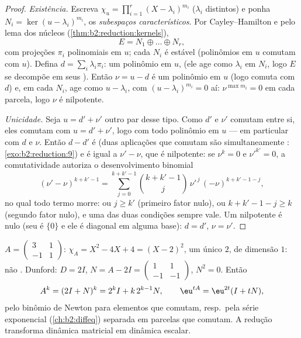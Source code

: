 \begin{proof}
\emph{Existência.} Escreva $\chi_u = \prod_{i=1}^{r} (X -
\lambda_i)^{m_i}$ ($\lambda_i$ distintos) e ponha $N_i = \ker(u -
\lambda_i)^{m_i}$, os \emph{subespaços característicos}. Por
Cayley--Hamilton e pelo lema dos núcleos
(\cref{thm:b2:reduction:kernels}),
\[
E = N_1 \oplus \dots \oplus N_r ,
\]
com projeções $\pi_i$ polinomiais em $u$; cada $N_i$ é estável
(polinômios em $u$ comutam com $u$). Defina $d = \sum_i \lambda_i
\pi_i$: um polinômio em $u$,  (ele age como $\lambda_i$
em $N_i$, logo $E$ se decompõe em seus ). Então $\nu = u -
d$ é um polinômio em $u$ (logo comuta com $d$) e, em cada
$N_i$, age como $u - \lambda_i$, com $(u - \lambda_i)^{m_i} = 0$
aí: $\nu^{\max m_i} = 0$ em cada parcela, logo $\nu$ é nilpotente.

\emph{Unicidade.} Seja $u = d' + \nu'$ outro par desse tipo. Como
$d'$ e $\nu'$ comutam entre si, eles comutam com $u = d' +
\nu'$, logo com todo polinômio em $u$ --- em particular com $d$
e $\nu$. Então $d - d'$ é  (duas aplicações
 que comutam são simultaneamente :
\cref{exo:b2:reduction:9}) e é igual a $\nu' - \nu$, que é
nilpotente: se $\nu^k = 0$ e $\nu'^{k'} = 0$, a comutatividade
autoriza o desenvolvimento binomial
\[
(\nu' - \nu)^{k + k' - 1}
= \sum_{j=0}^{k+k'-1}\binom{k + k' - 1}{j}
\,\nu'^{\,j}\,(-\nu)^{k + k' - 1 - j} ,
\]
no qual todo termo morre: ou $j \geq k'$ (primeiro fator
nulo), ou $k + k' - 1 - j \geq k$ (segundo fator nulo), e uma
das duas condições sempre vale. Um nilpotente  é nulo (seu
 é $\{0\}$ e ele é diagonal em alguma base): $d = d'$,
$\nu = \nu'$.
\end{proof}

\begin{example}\label{ex:b2:reduction:powers}
$A = \begin{pmatrix} 3 & 1\\ -1 & 1\end{pmatrix}$: $\chi_A = X^2 -
4X + 4 = (X-2)^2$, um único  $2$,  de dimensão
$1$: não . Dunford: $D = 2I$, $N = A - 2I =
\begin{pmatrix} 1 & 1\\ -1 & -1\end{pmatrix}$, $N^2 = 0$. Então
\[
A^k = (2I + N)^k = 2^k I + k\,2^{k-1} N ,
\qquad
\eu^{tA} = \eu^{2t}(I + tN),
\]
pelo binômio de Newton para elementos que comutam, resp.\ pela série exponencial
(\cref{ch:b2:diffeq}) separada em parcelas que comutam. A redução transforma
dinâmica matricial em dinâmica escalar.
\end{example}

